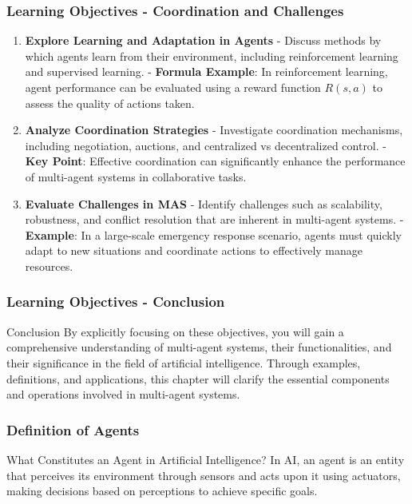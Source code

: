 \documentclass[aspectratio=169]{beamer}
\begin{document}
\begin{frame}[fragile]
    \frametitle{Learning Objectives - Coordination and Challenges}
    \begin{enumerate}[resume]
        \item \textbf{Explore Learning and Adaptation in Agents}  
        - Discuss methods by which agents learn from their environment, including reinforcement learning and supervised learning.  
        - \textbf{Formula Example}: In reinforcement learning, agent performance can be evaluated using a reward function \( R(s, a) \) to assess the quality of actions taken.

        \item \textbf{Analyze Coordination Strategies}  
        - Investigate coordination mechanisms, including negotiation, auctions, and centralized vs decentralized control.  
        - \textbf{Key Point}: Effective coordination can significantly enhance the performance of multi-agent systems in collaborative tasks.

        \item \textbf{Evaluate Challenges in MAS}  
        - Identify challenges such as scalability, robustness, and conflict resolution that are inherent in multi-agent systems.  
        - \textbf{Example}: In a large-scale emergency response scenario, agents must quickly adapt to new situations and coordinate actions to effectively manage resources.
    \end{enumerate}
\end{frame}

\begin{frame}[fragile]
    \frametitle{Learning Objectives - Conclusion}
    \begin{block}{Conclusion}
        By explicitly focusing on these objectives, you will gain a comprehensive understanding of multi-agent systems, their functionalities, and their significance in the field of artificial intelligence. Through examples, definitions, and applications, this chapter will clarify the essential components and operations involved in multi-agent systems.
    \end{block}
\end{frame}

\begin{frame}[fragile]
    \frametitle{Definition of Agents}
    \begin{block}{What Constitutes an Agent in Artificial Intelligence?}
        In AI, an agent is an entity that perceives its environment through sensors and acts upon it using actuators, making decisions based on perceptions to achieve specific goals.
    \end{block}
\end{frame}
\end{document}

